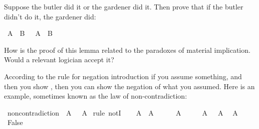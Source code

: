 \begin{isabellebody}
%
\endisatagproof
{\isafoldproof}%
%
\isadelimproof
%
\endisadelimproof
%
\begin{isamarkuptext}%
\begin{Exercise} Suppose the butler did it or the gardener did it. Then prove that if the butler didn't do it, 
the gardener did: \end{Exercise}%
\end{isamarkuptext}\isamarkuptrue%
\isamarkupfalse%
\ {\isachardoublequoteopen}A\ {\isasymor}\ B\ {\isasymlongrightarrow}\ {\isasymnot}\ A\ {\isasymlongrightarrow}\ B{\isachardoublequoteclose}%
\isadelimproof
\ %
\endisadelimproof
%
\isatagproof
{}\isamarkupfalse%
%
\endisatagproof
{\isafoldproof}%
%
\isadelimproof
%
\endisadelimproof
%
\begin{isamarkuptext}%
How is the proof of this lemma related to the paradoxes of material implication. Would a
relevant logician accept it?%
\end{isamarkuptext}\isamarkuptrue%
%
\isamarkuptrue%
%
\begin{isamarkuptext}%
According to the rule for negation introduction if you assume something, and then you show
, then you can show the negation of what you assumed. Here is an example, sometimes
known as the law of non-contradiction:%
\end{isamarkuptext}\isamarkuptrue%
\isamarkupfalse%
\ non{\isacharunderscore}contradiction{\isacharcolon}\ {\isachardoublequoteopen}{\isasymnot}\ {\isacharparenleft}A\ {\isasymand}\ {\isasymnot}\ A{\isacharparenright}{\isachardoublequoteclose}\isanewline
%
\isadelimproof
%
\endisadelimproof
%
\isatagproof
{}\isamarkupfalse%
\ {\isacharparenleft}rule\ notI{\isacharparenright}\isanewline
\ \ \isamarkupfalse%
\ {\isachardoublequoteopen}A\ {\isasymand}\ {\isasymnot}A{\isachardoublequoteclose}\isanewline
\ \ \isamarkupfalse%
\ {\isachardoublequoteopen}\ {\isasymnot}\ A{\isachardoublequoteclose}\isacommand{{\isachardot}{\isachardot}}\isamarkupfalse%
\isanewline
\ \ \isamarkupfalse%
\ \isamarkupfalse%
\ {\isacharbackquoteopen}A\ {\isasymand}\ {\isasymnot}\ A{\isacharbackquoteclose}\ \isamarkupfalse%
\ {\isachardoublequoteopen}A{\isachardoublequoteclose}\isacommand{{\isachardot}{\isachardot}}\isamarkupfalse%
\isanewline
\ \ \isamarkupfalse%
\ \isamarkupfalse%
\ {\isachardoublequoteopen}False{\isachardoublequoteclose}\ \isamarkupfalse%

\end{isabellebody}
